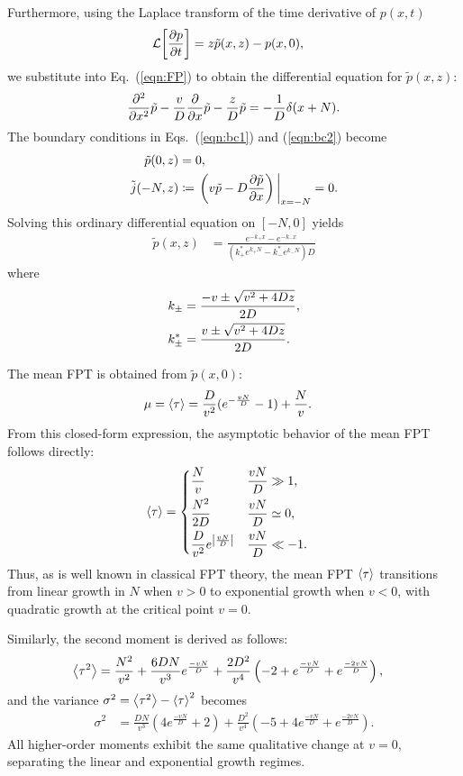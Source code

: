 \documentclass[%
 reprint,
superscriptaddress,
 amsmath,amssymb,
 aps,
 prx,
]{revtex4-2}
\begin{document}
Furthermore, using the Laplace transform of the time derivative of $p(x,t)$  
\begin{align}
    \mathcal{L} \qty[\pdv{p}{t}] &= z \tilde{p}(x,z) - p(x,0), 
\end{align}
we substitute into Eq.~(\ref{eqn:FP}) to obtain the differential equation for $\tilde{p}(x,z)$: 
\begin{align}
    \pdv[2]{x} \tilde{p} - \frac{v}{D} \pdv{x} \tilde{p} - \frac{z}{D} \tilde{p} = - \frac{1}{D} \delta(x+N).  \label{solve this:1}
\end{align}
The boundary conditions in Eqs.~(\ref{eqn:bc1}) and (\ref{eqn:bc2}) become   
\begin{align}
        \tilde{p}(0,z) & = 0, \\
        \tilde{j}(-N,z) & \coloneqq \eval{\left(v \tilde{p} - D \pdv{\tilde{p}}{x}\right)}_{x=-N}  = 0.
\end{align}
Solving this ordinary differential equation on $[-N, 0]$ yields  
\begin{align}
    \tilde{p}(x,z) &= \frac{e^{- k_+ x} - e^{- k_- x} }{(k_+^\ast e^{k_+ N} - k_-^\ast e^{k_- N})D} 
\end{align}
where
\begin{align}
 k_\pm & = \frac{- v \pm \sqrt{v^2 + 4Dz}}{2D}, \notag \\
 k_\pm^\ast &= \frac{v \pm \sqrt{v^2 + 4Dz}}{2D}. \notag
\end{align}

The mean FPT is obtained from $\tilde{p}(x,0)$:  
\begin{align}
   \mu= \expval{\tau} &= \frac{D}{v^2}(e^{- \frac{vN}{D}} - 1) + \frac{N}{v}.  
\end{align}
From this closed-form expression, the asymptotic behavior of the mean FPT follows directly: 
\begin{align}
\expval{\tau} &= 
    \begin{dcases}
        \frac{N}{v} & \frac{vN}{D} \gg 1, \\
        \frac{N^2}{2D} & \frac{vN}{D} \simeq 0, \\
        \frac{D}{v^2} e^{\abs{\frac{vN}{D}}} & \frac{vN}{D} \ll - 1. 
    \end{dcases}
\end{align}
Thus, as is well known in classical FPT theory, the mean FPT $\expval{\tau}$ transitions from linear growth in $N$ when $v>0$ to exponential growth when $v<0$, with quadratic growth at the critical point $v=0$. 

Similarly, the second moment is derived as follows: 
\begin{align}
    \expval{\tau^2} &= \frac{N^2}{v^2} + \frac{6 D N}{v^3} e^{\frac{- vN}{D}} + \frac{2 D^2}{v^4} \left(- 2 + e^\frac{-vN}{D} + e^{\frac{-2vN}{D}}\right), 
\end{align}
and the variance $\sigma^2=\expval{\tau^2}-\expval{\tau}^2$ becomes 
\begin{align}
    \sigma^2 
    &=\frac{DN}{v^3} \left( 4 e^\frac{-vN}{D} + 2\right) + \frac{D^2}{v^4} \left(-5 + 4 e^\frac{-vN}{D} + e^\frac{-2vN}{D} \right).  
\end{align}
All higher-order moments exhibit the same qualitative change at $v=0$, separating the linear and exponential growth regimes. 
\end{document}
